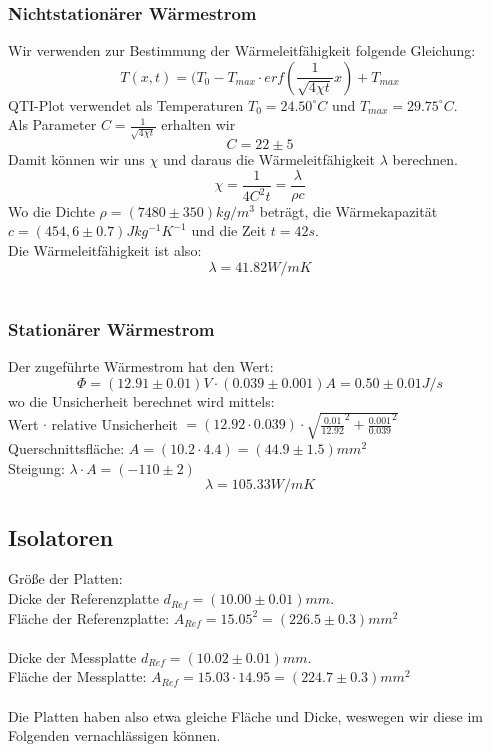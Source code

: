 \documentclass[12pt,a4paper,twopage]{article}
\begin{document}
\subsubsection{Nichtstationärer Wärmestrom}
Wir verwenden zur Bestimmung der Wärmeleitfähigkeit folgende Gleichung:
$$T(x,t)=(T_0 - T_{max} \cdot erf\left(\frac{1}{\sqrt{4\chi t}}x\right) + T_{max}$$
QTI-Plot verwendet als Temperaturen $T_0=24.50^\circ C$ und $T_{max}=29.75^\circ C$.\\
Als Parameter $C=\frac{1}{\sqrt{4\chi t}}$ erhalten wir
$$C=22 \pm 5$$
Damit können wir uns $\chi$ und daraus die Wärmeleitfähigkeit $\lambda$ berechnen.
$$\chi = \frac{1}{4C^2 t}=\frac{\lambda}{\rho c}$$
Wo die Dichte $\rho = (7480 \pm 350)kg/m^3$ beträgt, die Wärmekapazität $c=(454,6 \pm 0.7)Jkg^{-1}K^{-1}$ und die Zeit $t=42s$.\\
Die Wärmeleitfähigkeit ist also:
$$\boxed{\lambda = 41.82 W/m K}$$
\\
\subsubsection{Stationärer Wärmestrom}
Der zugeführte Wärmestrom hat den Wert:
$$\Phi=(12.91 \pm 0.01)V \cdot (0.039 \pm 0.001)A=0.50 \pm 0.01 J/s$$
wo die Unsicherheit berechnet wird mittels:\\
Wert $\cdot$ relative Unsicherheit $= (12.92 \cdot 0.039) \cdot \sqrt{\frac{0.01}{12.92}^2 + \frac{0.001}{0.039}^2}$\\


Querschnittsfläche: $A=(10.2 \cdot 4.4)=(44.9 \pm 1.5)mm^2$\\
Steigung: $\lambda \cdot A = (-110 \pm 2)$\\
$$\boxed{\lambda=105.33 W/m K}$$

\subsection{Isolatoren}
Größe der Platten:\\
Dicke der Referenzplatte $d_{Ref}=(10.00 \pm 0.01)mm$.\\
Fläche der Referenzplatte: $A_{Ref}=15.05^2=(226.5 \pm 0.3)mm^2$\\
\\
Dicke der Messplatte $d_{Ref}=(10.02 \pm 0.01)mm$.\\
Fläche der Messplatte: $A_{Ref}=15.03 \cdot 14.95=(224.7 \pm 0.3)mm^2$\\
\\
Die Platten haben also etwa gleiche Fläche und Dicke, weswegen wir diese im Folgenden vernachlässigen können.\\
\end{document}
